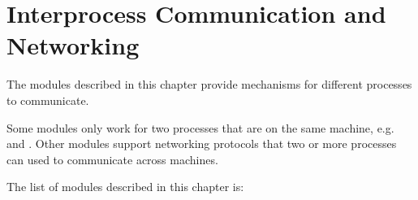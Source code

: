 \chapter{Interprocess Communication and Networking}
\label{ipc}

The modules described in this chapter provide mechanisms for different
processes to communicate.

Some modules only work for two processes that are on the same machine,
e.g.   and .  Other modules support
networking protocols that two or more processes can used to
communicate across machines.

The list of modules described in this chapter is:

\localmoduletable
